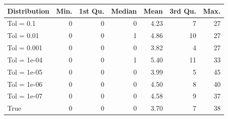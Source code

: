 \begin{figure} 
\begin{tabular}{lrrrrrr}
 Distribution & Min. & 1st Qu. & Median & Mean & 3rd Qu. & Max. \\ 
  \hline
\hline
Tol =  0.1 & 0 & 0 & 0 & 4.23 & 7 & 27 \\ 
  Tol =  0.01 & 0 & 0 & 1 & 4.86 & 10 & 27 \\ 
  Tol =  0.001 & 0 & 0 & 0 & 3.82 & 4 & 27 \\ 
  Tol =  1e-04 & 0 & 0 & 1 & 5.40 & 11 & 33 \\ 
  Tol =  1e-05 & 0 & 0 & 0 & 3.99 & 5 & 45 \\ 
  Tol =  1e-06 & 0 & 0 & 0 & 4.50 & 8 & 40 \\ 
  Tol =  1e-07 & 0 & 0 & 0 & 4.58 & 9 & 37 \\ 
  True & 0 & 0 & 0 & 3.70 & 7 & 38 \\ 
  \end{tabular}
\label{tab:SummaryTable}
\end{figure} 
